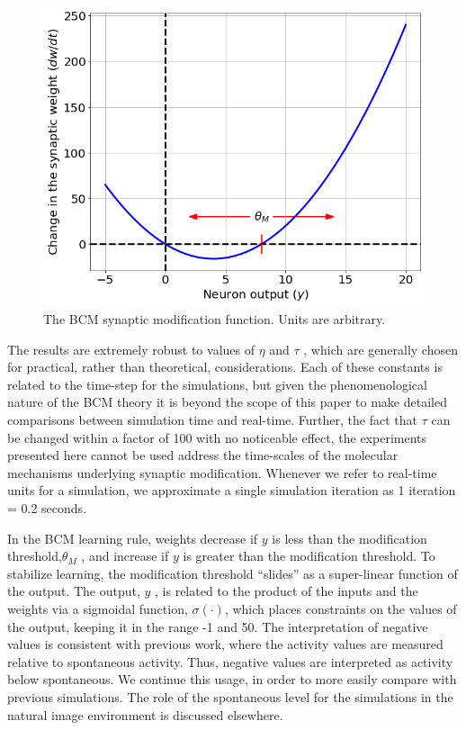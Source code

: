 \documentclass[
  letterpaper,
  number]{elsarticle}
\begin{document}
\begin{figure}[H]

{\centering \includegraphics{./Synaptic Modification_files/figure-pdf/fig-phi-output-1.png}

}

\caption{\label{fig-phi}The BCM synaptic modification function. Units
are arbitrary.}

\end{figure}

The results are extremely robust to values of \(\eta\) and \(\tau\) ,
which are generally chosen for practical, rather than theoretical,
considerations. Each of these constants is related to the time-step for
the simulations, but given the phenomenological nature of the BCM theory
it is beyond the scope of this paper to make detailed comparisons
between simulation time and real-time. Further, the fact that \(\tau\)
can be changed within a factor of 100 with no noticeable effect, the
experiments presented here cannot be used address the time-scales of the
molecular mechanisms underlying synaptic modification. Whenever we refer
to real-time units for a simulation, we approximate a single simulation
iteration as 1 iteration = 0.2 seconds\citep{phd:Blais98}.

In the BCM learning rule, weights decrease if \(y\) is less than the
modification threshold,\(\theta_M\) , and increase if \(y\) is greater
than the modification threshold. To stabilize learning, the modification
threshold ``slides'' as a super-linear function of the output. The
output, \(y\) , is related to the product of the inputs and the weights
via a sigmoidal function, \(\sigma(\cdot)\), which places constraints on
the values of the output, keeping it in the range -1 and 50. The
interpretation of negative values is consistent with previous
work\citep{BlaisEtAl98}, where the activity values are measured relative
to spontaneous activity. Thus, negative values are interpreted as
activity below spontaneous. We continue this usage, in order to more
easily compare with previous simulations. The role of the spontaneous
level for the simulations in the natural image environment is discussed
elsewhere\citep{BlaisEtAl98}.
\end{document}
